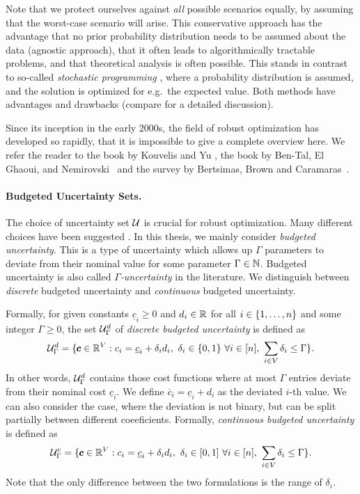 Note that we protect ourselves against \emph{all} possible scenarios equally, by assuming that the worst-case scenario will arise. This conservative approach has the advantage that no prior probability distribution needs to be assumed about the data (agnostic approach), that it often leads to algorithmically tractable problems, and that theoretical analysis is often possible. This stands in contrast to so-called \emph{stochastic programming} \cite{birge2011introduction}, where a probability distribution is assumed, and the solution is optimized for e.g.\ the expected value. Both methods have advantages and drawbacks (compare \cite{ben2009robust} for a detailed discussion).  
 
Since its inception in the early 2000s, the field of robust optimization has developed so rapidly, that it is impossible to give a complete overview here. We refer the reader to the book by Kouvelis and Yu \cite{kouvelis2013robust}, the book by Ben-Tal, El Ghaoui, and Nemirovski~\cite{ben2009robust} and the survey by Bertsimas, Brown and Caramaras~\cite{bertsimas2011theory}. 

\paragraph*{Budgeted Uncertainty Sets.}
The choice of uncertainty set $\mathcal{U}$ is crucial for robust optimization. Many different choices have been suggested \cite{poss2018robust,busing2012new,bertsimas2004robust,kasperski2016robust}. In this thesis, we mainly consider \emph{budgeted uncertainty}. This is a type of uncertainty which allows up $\Gamma$ parameters to deviate from their nominal value for some parameter $\Gamma \in \mathbb{N}$. Budgeted uncertainty is also called \emph{$\Gamma$-uncertainty} in the literature. We distinguish between \emph{discrete} budgeted uncertainty and \emph{continuous} budgeted uncertainty.

Formally, for given constants $\underline{c}_i \geq 0$ and $d_i \in \mathbb{R}$ for all $i \in \{ 1, \ldots, n \}$ and some integer $\Gamma \geq 0$, the set $\mathcal{U}^d_\Gamma$ of \emph{discrete budgeted uncertainty} is defined as
\[
\mathcal{U}^d_\Gamma = \{  \pmb c \in \mathbb{R}^V : c_i = \underline{c}_i + \delta_id_i,\  \delta_i \in \{ 0,1 \}\ \forall i \in [n],\ \sum_{i \in V}\delta_i \leq \Gamma  \}.
\]
In other words, $\mathcal{U}^d_\Gamma$ contains those cost functions where at most $\Gamma$ entries deviate from their nominal cost $\underline{c}_i$. We define $\overline{c}_i = \underline{c}_i + d_i$ as the deviated $i$-th value. We can also consider the case, where the deviation is not binary, but can be split partially between different coeeficients. Formally, \emph{continuous budgeted uncertainty} is defined as
\[
\cU^c_\Gamma = \set{ \pmb c \in \R^V : c_i = \underline{c}_i + \delta_id_i,\  \delta_i \in [0,1]\ \forall i \in [n],\ \sum_{i \in V}\delta_i \leq \Gamma }.
\]
Note that the only difference between the two formulations is the range of $\delta_i$.

